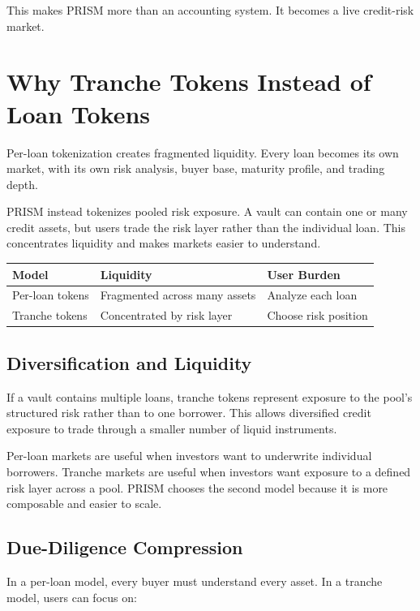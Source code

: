 \documentclass[11pt]{article}
\begin{document}
This makes PRISM more than an accounting system. It becomes a live credit-risk
market.

\section{Why Tranche Tokens Instead of Loan Tokens}

Per-loan tokenization creates fragmented liquidity. Every loan becomes its own
market, with its own risk analysis, buyer base, maturity profile, and trading
depth.

PRISM instead tokenizes pooled risk exposure. A vault can contain one or many
credit assets, but users trade the risk layer rather than the individual loan.
This concentrates liquidity and makes markets easier to understand.

\begin{center}
\begin{tabular}{p{}p{}p{}}
\toprule
Model & Liquidity & User Burden \\
\midrule
Per-loan tokens & Fragmented across many assets & Analyze each loan \\
Tranche tokens & Concentrated by risk layer & Choose risk position \\
\bottomrule
\end{tabular}
\end{center}

\subsection{Diversification and Liquidity}

If a vault contains multiple loans, tranche tokens represent exposure to the
pool's structured risk rather than to one borrower. This allows diversified
credit exposure to trade through a smaller number of liquid instruments.

Per-loan markets are useful when investors want to underwrite individual
borrowers. Tranche markets are useful when investors want exposure to a defined
risk layer across a pool. PRISM chooses the second model because it is more
composable and easier to scale.

\subsection{Due-Diligence Compression}

In a per-loan model, every buyer must understand every asset. In a tranche model,
users can focus on:
\end{document}
